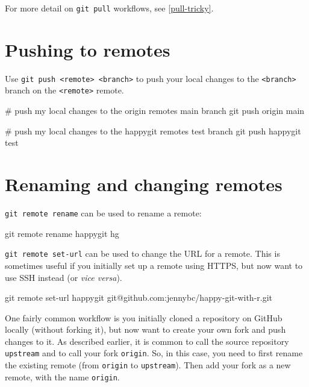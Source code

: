 \documentclass[
]{book}
\newenvironment{Shaded}{\begin{snugshade}}{\end{snugshade}}
\newcommand{\NormalTok}[1]{#1}
\begin{document}
For more detail on \texttt{git\ pull} workflows, see \ref{pull-tricky}.

\section{Pushing to remotes}\label{pushing-to-remotes}

Use \texttt{git\ push\ \textless{}remote\textgreater{}\ \textless{}branch\textgreater{}} to push your local changes to the \texttt{\textless{}branch\textgreater{}}
branch on the \texttt{\textless{}remote\textgreater{}} remote.

\begin{Shaded}
\begin{Highlighting}[]
\NormalTok{\# push my local changes to the origin remote\textquotesingle{}s main branch}
\NormalTok{git push origin main}

\NormalTok{\# push my local changes to the happygit remote\textquotesingle{}s test branch}
\NormalTok{git push happygit test}
\end{Highlighting}
\end{Shaded}

\section{Renaming and changing remotes}\label{renaming-and-changing-remotes}

\texttt{git\ remote\ rename} can be used to rename a remote:

\begin{Shaded}
\begin{Highlighting}[]
\NormalTok{git remote rename happygit hg}
\end{Highlighting}
\end{Shaded}

\texttt{git\ remote\ set-url} can be used to change the URL for a remote.
This is sometimes useful if you initially set up a remote using HTTPS, but now want to use SSH instead (or \emph{vice versa}).

\begin{Shaded}
\begin{Highlighting}[]
\NormalTok{git remote set{-}url happygit git@github.com:jennybc/happy{-}git{-}with{-}r.git}
\end{Highlighting}
\end{Shaded}

One fairly common workflow is you initially cloned a repository on GitHub
locally (without forking it), but now want to create your own fork and push
changes to it.
As described earlier, it is common to call the source repository \texttt{upstream} and to call your fork \texttt{origin}.
So, in this case, you need to first rename the existing remote (from \texttt{origin} to \texttt{upstream}).
Then add your fork as a new remote, with the name \texttt{origin}.
\end{document}
